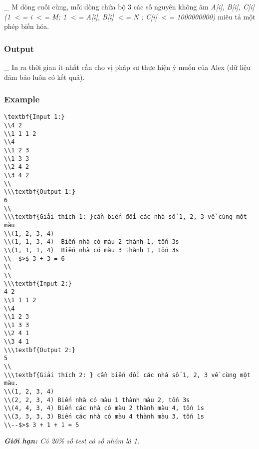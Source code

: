    \_ M dòng cuối cùng, mỗi dòng chứa bộ 3 các số nguyên không âm   \emph{    A[i], B[i], C[i] (1 $<$= i $<$= M; 1 $<$= A[i], B[i] $<$= N ; C[i] $<$= 1000000000)   }   miêu tả một phép biến hóa.  

\subsubsection{   Output  }

   \_ In ra thời gian ít nhất cần cho vị pháp sư thực hiện ý muốn của Alex (dữ liệu đảm bảo luôn có kết quả).  



\subsubsection{   Example  }
\begin{verbatim}
\textbf{Input 1:}
\\4 2 
\\1 1 1 2
\\4
\\1 2 3
\\1 3 3
\\2 4 2
\\3 4 2
\\
\\\textbf{Output 1:}
6
\\
\\\textbf{Giải thích 1: }cần biến đổi các nhà số 1, 2, 3 về cùng một màu
\\(1, 2, 3, 4)
\\(1, 1, 3, 4)  Biến nhà có màu 2 thành 1, tốn 3s
\\(1, 1, 1, 4)  Biến nhà có màu 3 thành 1, tốn 3s
\\--$>$ 3 + 3 = 6
\\
\\
\\\textbf{Input 2:}
4 2 
\\1 1 1 2
\\4
\\1 2 3
\\1 3 3
\\2 4 1
\\3 4 1
\\\textbf{Output 2:}
5 
\\
\\\textbf{Giải thích 2: } cần biến đổi các nhà số 1, 2, 3 về cùng một màu.
\\(1, 2, 3, 4)
\\(2, 2, 3, 4) Biến nhà có màu 1 thành màu 2, tốn 3s
\\(4, 4, 3, 4) Biến các nhà có màu 2 thành màu 4, tốn 1s
\\(3, 3, 3, 3) Biến các nhà có màu 4 thành màu 3, tốn 1s
\\--$>$ 3 + 1 + 1 = 5\end{verbatim}

\emph{\textbf{      Giới hạn:     }\textbf{}     Có 20\% số test có số nhóm là 1.    }